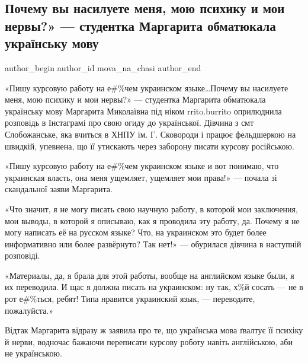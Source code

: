  
 
 
 
 
 
\subsection{Почему вы насилуете меня, мою психику и мои нервы?» — студентка Маргарита обматюкала українську мову}
\label{sec:16_06_2021.fb.mova_na_chasi.1.studentka_margarita_mova}
\ifcmt
 author_begin
   author_id mova_na_chasi
 author_end
\fi

«Пишу курсовую работу на е\#\%чем украинском языке…Почему вы насилуете меня, мою
психику и мои нервы?» — студентка Маргарита обматюкала українську мову
Маргарита Миколаївна під ніком rrito.burrito оприлюднила розповідь в Інстаграмі
про свою огиду до української. Дівчина з смт Слобожанське, яка вчиться в ХНПУ
ім. Г. Сковороди і працює фельдшеркою на швидкій, упевнена, що її утискають
через заборону писати курсову російською. 

«Пишу курсовую работу на е\#\%чем украинском языке и вот понимаю, что
украинская власть, она меня ущемляет, ущемляет мои права!» — почала зі
скандальної заяви Маргарита.

«Что значит, я не могу писать свою научную работу, в которой мои заключения,
мои выводы, в которой я описываю, как я проводила эту работу, да. Почему я не
могу написать её на русском языке? Что, на украинском это будет более
информативно или более развёрнуто? Так нет!» — обурилася дівчина в наступній
розповіді. 

«Материалы, да, я брала для этой работы, вообще на английском языке были, я их
переводила. И щас я должна писать на украинском: ну так, х\%й сосать — не в рот
е\#\%ться, ребят! Типа нравится украинский язык, — переводите, пожалуйста.» 

Відтак Маргарита відразу ж заявила про те, що українська мова ґвалтує її
психіку й нерви, водночас бажаючи переписати курсову роботу навіть англійською,
аби не українською.

